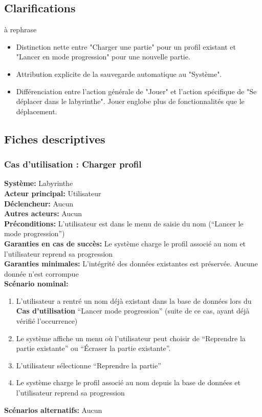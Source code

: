 \documentclass{butexFR}
\begin{document}
\subsection{Clarifications}

à rephrase

\begin{itemize}
    \item Distinction nette entre "Charger une partie" pour un profil existant et "Lancer en mode progression" pour une nouvelle partie.
    \item Attribution explicite de la sauvegarde automatique au "Système".
    \item Différenciation entre l'action générale de "Jouer" et l'action spécifique de "Se déplacer dans le labyrinthe". Jouer englobe plus de fonctionnalités que le déplacement.
\end{itemize}

\newpage

\subsection{Fiches descriptives}
\subsubsection{Cas d'utilisation : Charger profil}
\textbf{Système:} Labyrinthe\\
\textbf{Acteur principal:} Utilisateur\\
\textbf{Déclencheur:} Aucun\\
\textbf{Autres acteurs:} Aucun\\[0.25em]
\textbf{Préconditions:} L'utilisateur est dans le menu de saisie du nom (``Lancer le mode progression'')\\
\textbf{Garanties en cas de succès:} Le système charge le profil associé au nom et l'utilisateur reprend sa progression\\
\textbf{Garanties minimales:} L'intégrité des données existantes est préservée. Aucune donnée n'est corrompue\\[0.25em]
\textbf{Scénario nominal:}
\begin{enumerate}
    \item L'utilisateur a rentré un nom déjà existant dans la base de données lors du \textbf{Cas d'utilisation} ``Lancer mode progression'' (suite de ce cas, ayant déjà vérifié l'occurrence)
    \item Le système affiche un menu où l'utilisateur peut choisir de ``Reprendre la partie existante'' ou ``Écraser la partie existante''.
    \item L'utilisateur sélectionne ``Reprendre la partie''
    \item Le système charge le profil associé au nom depuis la base de données et l'utilisateur reprend sa progression
\end{enumerate}
\textbf{Scénarios alternatifs:} Aucun
\end{document}
